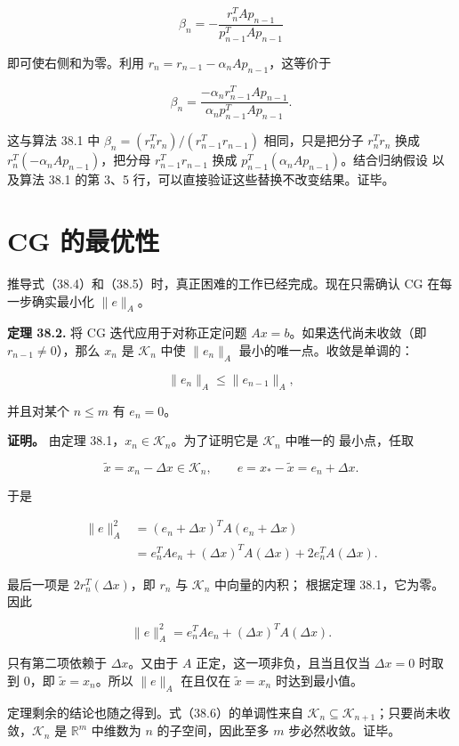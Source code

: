 \documentclass[UTF8,fontset=none,12pt]{ctexart}
\begin{document}
\[
\beta_n=-\frac{r_n^TAp_{n-1}}{p_{n-1}^TAp_{n-1}}
\]

即可使右侧和为零。利用 $r_n=r_{n-1}-\alpha_nAp_{n-1}$，这等价于

\[
\beta_n=
\frac{-\alpha_nr_{n-1}^TAp_{n-1}}
{\alpha_np_{n-1}^TAp_{n-1}}.
\]

这与算法 38.1 中
$\beta_n=(r_n^Tr_n)/(r_{n-1}^Tr_{n-1})$ 相同，只是把分子
$r_n^Tr_n$ 换成 $r_n^T(-\alpha_nAp_{n-1})$，把分母
$r_{n-1}^Tr_{n-1}$ 换成 $p_{n-1}^T(\alpha_nAp_{n-1})$。结合归纳假设
以及算法 38.1 的第 3、5 行，可以直接验证这些替换不改变结果。证毕。

\section*{CG 的最优性}

推导式（38.4）和（38.5）时，真正困难的工作已经完成。现在只需确认 CG
在每一步确实最小化 $\lVert e\rVert_A$。

\textbf{定理 38.2.}
将 CG 迭代应用于对称正定问题 $Ax=b$。如果迭代尚未收敛（即
$r_{n-1}\ne0$），那么 $x_n$ 是 $\mathcal K_n$ 中使 $\lVert e_n\rVert_A$
最小的唯一点。收敛是单调的：

\begin{equation}
\lVert e_n\rVert_A\leq\lVert e_{n-1}\rVert_A,
\tag{38.6}
\end{equation}

并且对某个 $n\leq m$ 有 $e_n=0$。

\textbf{证明。}
由定理 38.1，$x_n\in\mathcal K_n$。为了证明它是 $\mathcal K_n$ 中唯一的
最小点，任取

\[
\widetilde x=x_n-\Delta x\in\mathcal K_n,
\qquad
e=x_\ast-\widetilde x=e_n+\Delta x.
\]

于是

\[
\begin{aligned}
\lVert e\rVert_A^2
&=(e_n+\Delta x)^TA(e_n+\Delta x)\\
&=e_n^TAe_n+(\Delta x)^TA(\Delta x)+2e_n^TA(\Delta x).
\end{aligned}
\]

最后一项是 $2r_n^T(\Delta x)$，即 $r_n$ 与 $\mathcal K_n$ 中向量的内积；
根据定理 38.1，它为零。因此

\[
\lVert e\rVert_A^2=e_n^TAe_n+(\Delta x)^TA(\Delta x).
\]

只有第二项依赖于 $\Delta x$。又由于 $A$ 正定，这一项非负，且当且仅当
$\Delta x=0$ 时取到 0，即 $\widetilde x=x_n$。所以 $\lVert e\rVert_A$
在且仅在 $\widetilde x=x_n$ 时达到最小值。

定理剩余的结论也随之得到。式（38.6）的单调性来自
$\mathcal K_n\subseteq\mathcal K_{n+1}$；只要尚未收敛，$\mathcal K_n$ 是
$\mathbb R^m$ 中维数为 $n$ 的子空间，因此至多 $m$ 步必然收敛。证毕。
\end{document}
